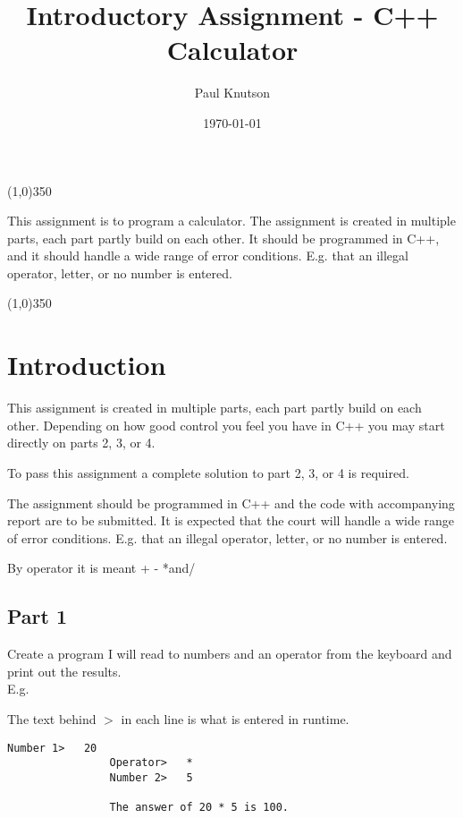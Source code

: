 \documentclass{article}
\begin{document}
	\title{Introductory Assignment - C++ Calculator}
	\date{\today}
	\author{Paul Knutson}
	\maketitle
	\thispagestyle{empty}
	
	\begin{center}
		\line(1,0){350}
	\end{center}
	
	\hfill \break
	This assignment is to program a calculator.
	The assignment is created in multiple parts, each part partly build on each other. It should be programmed in C++, and it should handle a wide range of error conditions. E.g. that an illegal operator, letter, or no number is entered.
	
	\begin{center}
		\line(1,0){350}
	\end{center}
	
	\clearpage

	\tableofcontents{}
	\clearpage
	
	
	\section{Introduction}
		This assignment is created in multiple parts, each part partly build on each other. Depending on how good control you feel you have in C++ you may start directly on parts 2, 3, or 4.
		
		To pass this assignment a complete solution to part 2, 3, or 4 is required.
		
		The assignment should be programmed in C++ and the code with accompanying report are to be submitted. It is expected that the court will handle a wide range of error conditions. E.g. that an illegal operator, letter, or no number is entered.
		
		By operator it is meant + - *and/
		
		\subsection{Part 1}
			Create a program I will read to numbers and an operator from the keyboard and print out the results. \\
			
			E.g.
			
			The text behind $>$ in each line is what is entered in runtime.
			\begin{lstlisting}[numbers=none]
				Number 1>	20
				Operator>	*
				Number 2>	5
				
				The answer of 20 * 5 is 100.
			\end{lstlisting}
\end{document}
